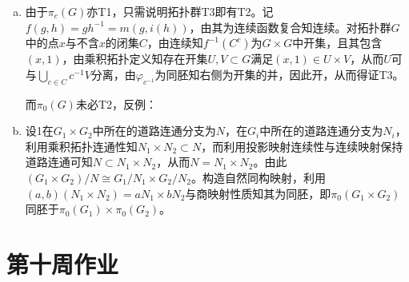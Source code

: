 \documentclass[a4paper,UTF8,fontset=windows]{ctexart}
\begin{document}
\begin{enumerate}[(1)]
\begin{enumerate}[(a)]
    \item
    由于$\pi_c(G)$亦T1，只需说明拓扑群T3即有T2。记$f(g,h)=gh^{-1}=m(g,i(h))$，由其为连续函数复合知连续。对拓扑群$G$中的点$x$与不含$x$的闭集$C$，由连续知$f^{-1}(C^c)$为$G\times G$中开集，且其包含$(x,1)$，由乘积拓扑定义知存在开集$U,V\subset G$满足$(x,1)\in U\times V$，从而$U$可与$\bigcup_{c\in C}c^{-1}V$分离，由$\varphi_{c^{-1}}$为同胚知右侧为开集的并，因此开，从而得证T3。
    
    而$\pi_0(G)$未必T2，反例：
    
    \item
    设1在$G_1\times G_2$中所在的道路连通分支为$N$，在$G_i$中所在的道路连通分支为$N_i$，利用乘积拓扑连通性知$N_1\times N_2\subset N$，而利用投影映射连续性与连续映射保持道路连通可知$N\subset N_1\times N_2$，从而$N=N_1\times N_2$。由此$(G_1\times G_2)/N\cong G_1/N_1\times G_2/N_2$。构造自然同构映射，利用$(a,b)(N_1\times N_2)=aN_1\times bN_2$与商映射性质知其为同胚，即$\pi_0(G_1\times G_2)$同胚于$\pi_0(G_1)\times\pi_0(G_2)$。
    \end{enumerate}
\end{enumerate}

\section{第十周作业}
\end{document}
